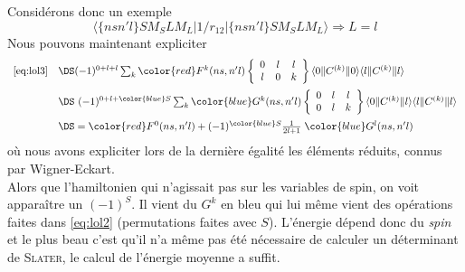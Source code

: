 Considérons donc un exemple
\begin{equation}
\langle  \{  ns n'l  \} SM_S LM_L \vert 1/r_{12} 
\vert  \{  ns n'l \} SM_S LM_L  \rangle 
\Rightarrow L=l
\end{equation}
Nous pouvons maintenant expliciter
\begin{equation}
\begin{array}{ll}
\eqref{eq:lol3} &\DS(-1)^{0 + l + l } \sum_k 
{\color{red} F^k(ns,n'l) } \left\{ 
\begin{array}{ccc} 0 & l & l \\ l & 0 &k \end{array} \right\} 
            \langle 0 \Vert C^{(k)} \Vert 0 \rangle  
\langle l \Vert C^{(k)} \Vert l \rangle\vspace{2mm}\\
&\DS\ (-1)^{0 + l + {\color{blue} S} } \sum_k 
{\color{blue} G^k(ns,n'l) } \left\{
 \begin{array}{ccc} 0 & l & l \\ 0 & l &k \end{array} \right\} 
            \langle 0 \Vert C^{(k)} \Vert l \rangle  
\langle l \Vert C^{(k)} \Vert l \rangle\vspace{2mm}\\
&\DS = {\color{red} F^0(ns,n'l)} +(-1)^{\color{blue} S} \frac{1}{2l+1} \; 
{\color{blue} G^l(ns,n'l)}
\end{array}
\end{equation}
où nous avons expliciter lors de la dernière égalité les éléments réduits, connus par Wigner-Eckart.\\

Alors que l'hamiltonien qui n'agissait pas sur les variables de spin, on voit apparaître un $(-1)^S$. 
Il vient du $G^k$ en bleu qui lui même vient des opérations faites dans \eqref{eq:lol2} (permutations
faites avec $S$). L'énergie dépend donc du \textit{spin} et le plus beau c'est qu'il n'a même pas
été nécessaire de calculer un déterminant de \textsc{Slater}, le calcul de l'énergie moyenne a 
suffit.\\

